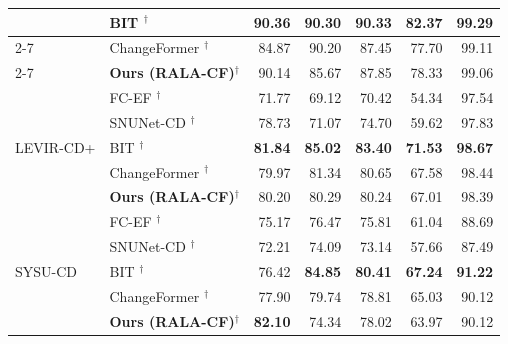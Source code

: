 \begin{table}[htbp]
{\begin{tabularx}{\textwidth}{|l|X|r|r|r|r|r|}
    & BIT \cite{Chen2022BIT}$^\dagger$
        & \textbf{90.36} & \textbf{90.30} & \textbf{90.33} & \textbf{82.37} & \textbf{99.29} \\ \cline{2-7}
    & ChangeFormer \cite{Bandara2022ChangeFormer}$^\dagger$
        & 84.87 & 90.20 & 87.45 & 77.70 & 99.11 \\ \cline{2-7}
\rowcolor{pastelorange}
    & \textbf{Ours (RALA-CF)}$^\dagger$
        & 90.14 & 85.67 & 87.85 & 78.33 & 99.06 \\
\hline
\multirow{5}{*}{LEVIR-CD+}
    & FC-EF \cite{Daudt2018SiamICIP}$^\dagger$
        & 71.77 & 69.12 & 70.42 & 54.34 & 97.54 \\ \cline{2-7}
    & SNUNet-CD \cite{Fang2021SNUNetCD}$^\dagger$
        & 78.73 & 71.07 & 74.70 & 59.62 & 97.83 \\ \cline{2-7}
    & BIT \cite{Chen2022BIT}$^\dagger$
        & \textbf{81.84} & \textbf{85.02} & \textbf{83.40} & \textbf{71.53} & \textbf{98.67} \\ \cline{2-7}
    & ChangeFormer \cite{Bandara2022ChangeFormer}$^\dagger$
        & 79.97 & 81.34 & 80.65 & 67.58 & 98.44 \\ \cline{2-7}
\rowcolor{pastelorange}
    & \textbf{Ours (RALA-CF)}$^\dagger$
        & 80.20 & 80.29 & 80.24 & 67.01 & 98.39 \\
\hline
\multirow{5}{*}{SYSU-CD}
    & FC-EF \cite{Daudt2018SiamICIP}$^\dagger$
        & 75.17 & 76.47 & 75.81 & 61.04 & 88.69 \\
        \cline{2-7}
    & SNUNet-CD \cite{Fang2021SNUNetCD}$^\dagger$
        & 72.21 & 74.09 & 73.14 & 57.66 & 87.49 \\
        \cline{2-7}
    & BIT \cite{Chen2022BIT}$^\dagger$
        & 76.42 & \textbf{84.85} & \textbf{80.41} & \textbf{67.24} & \textbf{91.22} \\
        \cline{2-7}
    & ChangeFormer \cite{Bandara2022ChangeFormer}$^\dagger$
            & 77.90 & 79.74 & 78.81 & 65.03 & 90.12 \\
            \cline{2-7}
\rowcolor{pastelorange}
    & \textbf{Ours (RALA-CF)}$^\dagger$
        & \textbf{82.10} & 74.34 & 78.02 & 63.97 & 90.12 \\

\end{tabularx}}
\end{table}

